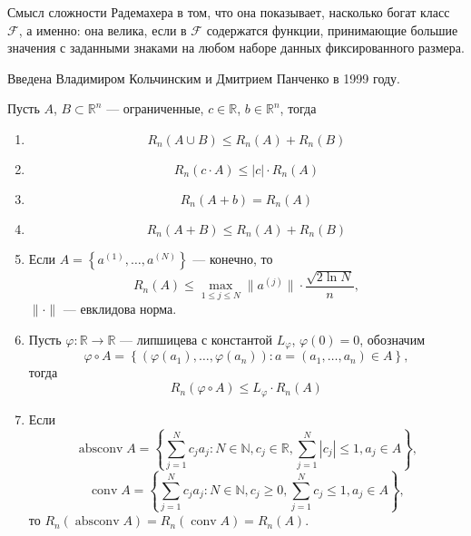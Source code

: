 \documentclass[12pt]{article}
\newtheorem{theorem}{\hskip\parindent Теорема}%
\begin{document}
Смысл сложности Радемахера в том, что она показывает, насколько богат класс $\mathcal{F}$, а именно: она велика, если в $\mathcal{F}$ содержатся функции, принимающие большие значения с заданными знаками на любом наборе данных фиксированного размера.

Введена Владимиром Кольчинским и Дмитрием Панченко в 1999 году.
\begin{theorem}\label{thProperties}
Пусть $A$, $B\subset\mathbb{R}^n$ --- ограниченные, $c\in\mathbb{R}$, $b\in\mathbb{R}^n$, тогда
\begin{enumerate}
	\item\label{eqProperty1}
	\begin{equation*}
		R_n(A\cup B)\leqslant R_n(A)+R_n(B)
	\end{equation*}
	\item\label{eqProperty2}
	\begin{equation*}
		R_n(c\cdot A)\leqslant|c|\cdot R_n(A)
	\end{equation*}
	\item\label{eqProperty3}
	\begin{equation*}
		R_n(A+b)=R_n(A)
	\end{equation*}
	\item\label{eqProperty4}
	\begin{equation*}
		R_n(A+B)\leqslant R_n(A)+R_n(B)
	\end{equation*}
\item\label{eqProperty5}
Если $A=\left\{a^{(1)},\dots, a^{(N)}\right\}$ --- конечно, то
\begin{equation*}
	R_n(A)\leqslant\max\limits_{1\leqslant j\leqslant N}\|a^{(j)}\|\cdot\frac{\sqrt{2\ln N}}{n},
\end{equation*}
$\|\cdot\|$ --- евклидова норма.
\item\label{eqProperty6}
Пусть $\varphi:\mathbb{R}\to\mathbb{R}$ --- липшицева с константой $L_\varphi$, $\varphi(0)=0$, обозначим
\begin{equation*}
	\varphi\circ A=\left\{(\varphi(a_1), \dots,\varphi(a_n)): a=(a_1,\dots, a_n)\in A\right\},
\end{equation*}
тогда 
\begin{equation*}
	R_n(\varphi\circ A)\leqslant L_\varphi\cdot R_n(A)
\end{equation*}
\item\label{eqProperty7}
Если
\begin{equation*}
	\operatorname{absconv}A=\left\{\sum\limits_{j=1}^{N}c_ja_j: N\in\mathbb{N}, c_j\in\mathbb{R}, \sum\limits_{j=1}^{N}|c_j|\leqslant1, a_j\in A\right\},
\end{equation*}
\begin{equation*}
	\operatorname{conv}A=\left\{\sum\limits_{j=1}^{N}c_ja_j: N\in\mathbb{N}, c_j\geqslant0, \sum\limits_{j=1}^{N}c_j\leqslant1, a_j\in A\right\},
\end{equation*}
то $R_n(\operatorname{absconv}A)=R_n(\operatorname{conv} A)=R_n(A)$.
\end{enumerate}
\end{theorem}
\end{document}
